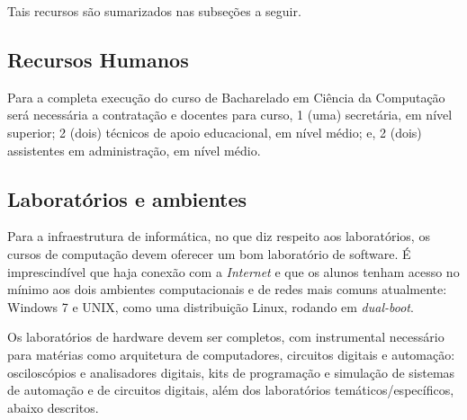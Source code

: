 \documentclass[
	12pt,				%
	openright,			%
  oneside,     %
	a4paper,			%
	english,			%
	french,				%
	spanish,			%
	brazil				%
	]{abntex2}
\begin{document}
Tais recursos são sumarizados nas subseções a seguir.



\subsection{Recursos Humanos}

Para a completa execução do curso de Bacharelado em  Ciência da Computação será
necessária a contratação e docentes para curso, 1 (uma)  secretária, em nível
superior; 2 (dois) técnicos de apoio educacional, em nível médio; e, 2 (dois)
assistentes em administração, em nível médio.

\subsection{Laboratórios e ambientes}

Para a infraestrutura de informática, no que diz respeito aos laboratórios, os
cursos de computação devem oferecer um bom laboratório de software.  É
imprescindível que haja conexão com a \textit{Internet} e que os alunos tenham
acesso no mínimo aos dois ambientes computacionais e de redes mais comuns
atualmente: Windows 7 e UNIX, como uma distribuição Linux, rodando em
\textit{dual-boot}. 

Os laboratórios de hardware devem ser completos, com
instrumental  necessário para  matérias como arquitetura de computadores, 
circuitos digitais e automação: osciloscópios e analisadores digitais,  kits de
programação e simulação de sistemas de automação e de circuitos digitais, além
dos laboratórios temáticos/específicos, abaixo descritos.
\end{document}
